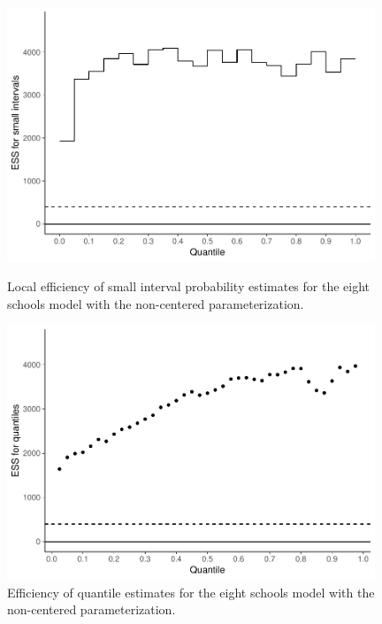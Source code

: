 \documentclass[american,]{article}
\begin{document}
\begin{figure}[tp]
  \begin{minipage}{0.48\textwidth}
  \centering
  \includegraphics[width=0.98\textwidth]{graphics/local-ess-fit-ncp2-1.pdf}
  \caption{Local efficiency of small interval probability estimates for the  
  eight schools model with the non-centered parameterization.}
  \label{fig:local-ess-fit-ncp2-1}
\end{minipage}
\hfill
  \begin{minipage}{0.48\textwidth}
  \includegraphics[width=0.98\textwidth]{graphics/quantile-ess-fit-ncp2-1.pdf}
  \caption{Efficiency of quantile estimates for the eight schools model with 
  the non-centered parameterization.}
  \label{fig:quantile-ess-fit-ncp2-1}
\end{minipage}
\end{figure}
\end{document}
